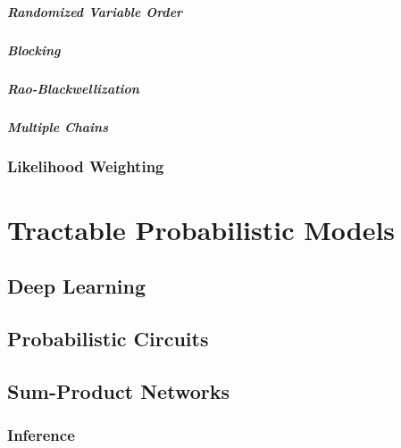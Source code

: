 				\paragraph{Randomized Variable Order} %

				\paragraph{Blocking} %

				\paragraph{Rao-Blackwellization} %

				\paragraph{Multiple Chains} %

		\subsection{Likelihood Weighting} %

\chapter{Tractable Probabilistic Models} %

	\section{Deep Learning} %

	\section{Probabilistic Circuits} %

	\section{Sum-Product Networks} %

		\subsection{Inference} %

